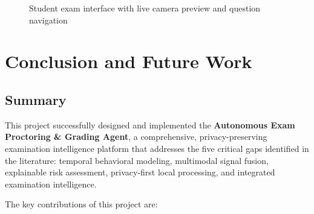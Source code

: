 \documentclass{article}
\begin{document}
\begin{figure}[H]
    \centering
    \caption{Student exam interface with live camera preview and question navigation}
    \label{fig:student_exam}
\end{figure}

\section{Conclusion and Future Work}
\label{sec:conclusion}

\subsection{Summary}

This project successfully designed and implemented the \textbf{Autonomous Exam Proctoring \& Grading Agent}, a comprehensive, privacy-preserving examination intelligence platform that addresses the five critical gaps identified in the literature: temporal behavioral modeling, multimodal signal fusion, explainable risk assessment, privacy-first local processing, and integrated examination intelligence.

The key contributions of this project are:
\end{document}
